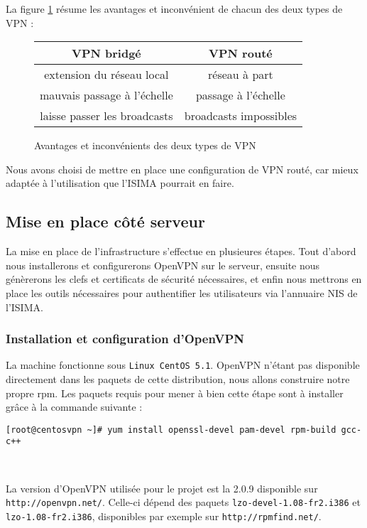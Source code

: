 La figure \ref{tableau_types_vpn} résume les avantages et inconvénient de chacun des deux types de VPN :
\begin{figure}[H]
	\begin{center}
		\begin{tabular}{c|c}
			VPN bridgé & VPN routé \\
			\hline
			extension du réseau local & réseau à part \\
			mauvais passage à l'échelle & passage à l'échelle \\
			laisse passer les broadcasts & broadcasts impossibles \\
		\end{tabular}
	\end{center}
	\caption{Avantages et inconvénients des deux types de VPN}
	\label{tableau_types_vpn}
\end{figure}

Nous avons choisi de mettre en place une configuration de VPN routé, car mieux adaptée à l'utilisation que l'ISIMA pourrait en faire.

\subsection{Mise en place côté serveur}

La mise en place de l'infrastructure s'effectue en plusieures étapes. Tout d'abord nous installerons et configurerons OpenVPN sur le serveur, ensuite nous génèrerons les clefs et certificats de sécurité nécessaires, et enfin nous mettrons en place les outils nécessaires pour authentifier les utilisateurs via l'annuaire NIS de l'ISIMA.

\subsubsection{Installation et configuration d'OpenVPN}

La machine fonctionne sous \texttt{Linux CentOS 5.1}. OpenVPN n'étant pas disponible directement dans les paquets de cette distribution, nous allons construire notre propre rpm. Les paquets requis pour mener à bien cette étape sont à installer grâce à la commande suivante :

\verb|[root@centosvpn ~]# yum install openssl-devel pam-devel rpm-build gcc-c++|

~

La version d'OpenVPN utilisée pour le projet est la 2.0.9 disponible sur \verb|http://openvpn.net/|. Celle-ci dépend des paquets \verb|lzo-devel-1.08-fr2.i386| et \verb|lzo-1.08-fr2.i386|, disponibles par exemple sur \verb|http://rpmfind.net/|.

